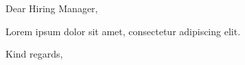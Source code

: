 \documentclass{vitaeletter}
\begin{document}
\opening{Dear Hiring Manager,}
Lorem ipsum dolor sit amet, consectetur adipiscing elit.
\closing{Kind regards,}
\end{document}
